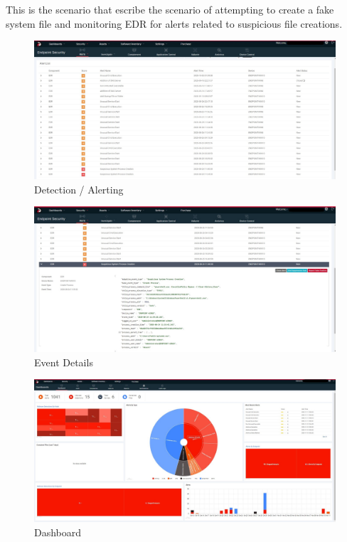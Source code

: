 \documentclass{article}
\begin{document}
This is the scenario that escribe the scenario of attempting to create a fake system file and monitoring EDR for alerts related to suspicious file creations.




\begin{figure}[H]
    \centering
    \includegraphics[width=1\textwidth]{Alerting.jpg}
    \caption{Detection / Alerting}
    \label{fig:alerting}
\end{figure}

\begin{figure}[H]
    \centering
    \includegraphics[width=1\textwidth]{Event-details.jpg}
    \caption{Event Details}
    \label{fig:event-detials}
\end{figure}

\begin{figure}[H]
    \centering
    \includegraphics[width=1\textwidth]{Dashboard.jpg}
    \caption{Dashboard}
    \label{fig:dashboard}
\end{figure}
\end{document}
